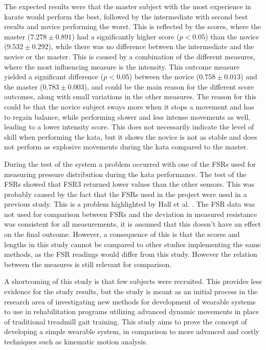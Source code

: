 
The expected results were that the master subject with the most experience in karate would perform the best, followed by the intermediate with second best results and novice performing the worst. This is reflected by the scores, where the master ($7.278 \pm 0.891$) had a significantly higher score ($p<0.05$) than the novice ($9.532 \pm 0.292$), while there was no difference between the intermediate and the novice or the master. This is caused by a combination of the different measures, where the most influencing measure is the intensity. This outcome measure yielded a significant difference ($p<0.05$) between the novice ($0.758 \pm 0.013$) and the master ($0.783 \pm 0.003$), and could be the main reason for the different score outcomes, along with small variations in the other measures. The reason for this could be that the novice subject sways more when it stops a movement and has to regain balance, while performing slower and less intense movements as well, leading to a lower intensity score. This does not necessarily indicate the level of skill when performing the kata, but it shows the novice is not as stable and does not perform as explosive movements during the kata compared to the master.

During the test of the system a problem occurred with one of the FSRs used for measuring pressure distribution during the kata performance. The test of the FSRs showed that FSR3 returned lower values than the other sensors. This was probably caused by the fact that the FSRs used in the project were used in a previous study. This is a problem highlighted by Hall et al. \cite{Hall2008}. The FSR data was not used for comparison between FSRs and the deviation in measured resistance was consistent for all measurements, it is assumed that this doesn’t have an effect on the final outcome. However, a consequence of this is that the scores and lengths in this study cannot be compared to other studies implementing the same methods, as the FSR readings would differ from this study. However the relation between the measures is still relevant for comparison.

A shortcoming of this study is that few subjects were recruited. This provides less evidence for the study results, but the study is meant as an initial process in the research area of investigating new methods for development of wearable systems to use in rehabilitation programs utilizing advanced dynamic movements in place of traditional treadmill gait training. This study aims to prove the concept of developing a simple wearable system, in comparison to more advanced and costly techniques such as kinematic motion analysis. 

